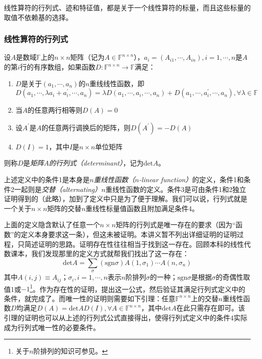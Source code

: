 \documentclass[../main.tex]{subfiles}
\begin{document}
线性算符的行列式、迹和特征值，都是关于一个线性算符的标量，而且这些标量的取值不依赖基的选择。
\subsubsection{线性算符的行列式}
\begin{definition}\label{def:II.2.17}
    设$A$是数域$\mathbb{F}$上的$n\times n$矩阵（记为$A\in\mathbb{F}^{n\times n}$），$a_i=\left(A_{i1},\cdots,A_{in}\right),i=1,\cdots,n$是$A$的第$i$行的有序数组，如果函数$D:\mathbb{F}^{n\times n}\rightarrow\mathbb{F}$满足：
    \begin{enumerate}
        \item $D$是关于$\left(a_1,\cdots,a_n\right)$的$n$重线线性函数，即
              \[
                  D\left(a_1,\cdots,\lambda a_i+a^\prime_i,\cdots,a_n\right)=\lambda D\left(a_1,\cdots,a_i,\cdots,a_n\right)+D\left(a_1,\cdots,a^\prime_i,\cdots,a_n\right),\forall\lambda\in\mathbb{F}
              \]
        \item 当$A$的任意两行相等则$D\left(A\right)=0$
        \item 设$A^\prime$是$A$的任意两行调换后的矩阵，则$D\left(A^\prime\right)=-D\left(A\right)$
        \item $D\left(I\right)=1$，其中$I$是$n\times n$单位矩阵
    \end{enumerate}
    则称$D$是\emph{矩阵$A$的行列式（determinant）}，记为$\mathrm{det}A$。
\end{definition}
上述定义中的条件1是本身是\emph{$n$重线性函数（$n$-linear function）}的定义，条件1和条件2一起则是\emph{交替（alternating）}$n$重线性函数的定义。条件3是可由条件1和2独立证明得到的（此略\cite[\S 5.2]{Hoffman1971}），加到了定义中只是为了便于理解。我们可以说，行列式就是一个关于$n\times n$矩阵的交替$n$重线性标量值函数且附加满足条件4。

上面的定义隐含默认了任意一个$n\times n$矩阵的行列式是唯一存在的要求（因为“函数”的定义本身要求这一条），但这未被证明。本讲义暂不列出详细证明的证明过程，只简述证明的思路。证明存在性往往相当于找到这一存在。回顾本科的线性代数课本，我们发现那里的定义方式\cite[\S 1.3 定义3.1]{周胜林2012线性代数}就帮我们找出了这一存在：
\[
    \mathrm{det}A=\sum_{\sigma}\left(\mathrm{sgn}\sigma\right)A\left(1,\sigma_1\right)\cdots A\left(n,\sigma_n\right)
\]
其中$A\left(i,j\right)\equiv A_{ij}$；$\sigma_i,i=1,\cdots,n$表示$n$阶排列$\sigma$的一种；$\mathrm{sgn}\sigma$是根据$\sigma$的奇偶性取值1或$-1$\footnote{关于$n$阶排列的知识可参见\cite[\S1.2]{周胜林2012线性代数}。}。作为存在性的证明，提出这一公式，然后验证其满足行列式定义中的条件，就完成了。而唯一性的证明则需要如下引理：任意$\mathbb{F}^{n\times n}$上的交替$n$重线性函数$D$均满足$D\left(A\right)=\mathrm{det}AD\left(I\right),\forall A\in\mathbb{F}^{n\times n}$，其中$\mathrm{det}A$在此只需存在即可。该引理的证明也可以从上述的行列式公式直接得出，使得行列式定义中的条件4实际成为行列式唯一性的必要条件。
\end{document}
